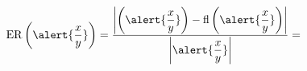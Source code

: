 \begin{frame}
\begin{solution}
\begin{enumerate}
\begin{itemize}
				            \begin{math}
					            \operatorname{ER}
					            \left(\alert{\dfrac{x}{y}}\right)=
					            \dfrac{
						            \left|
						            \left(\alert{\dfrac{x}{y}}\right)-
						            \operatorname{fl}
						            \left(\alert{\dfrac{x}{y}}\right)
						            \right|
					            }{
						            \left|
						            \alert{\dfrac{x}{y}}
						            \right|
					            }=
				            \end{math}
			      \end{itemize}
		\end{enumerate}
	\end{solution}
\end{frame}